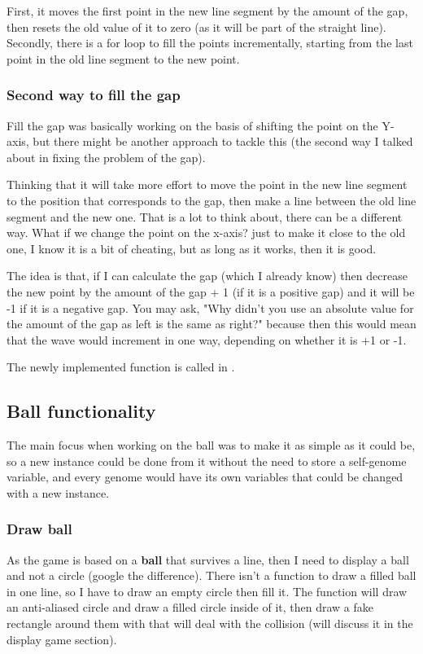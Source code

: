 First, it moves the first point in the new line segment by the amount of the gap, then resets the old value of it to zero (as it will be part of the straight line). Secondly, there is a for loop to fill the points incrementally, starting from the last point in the old line segment to the new point.

\subsubsection{Second way to fill the gap}

Fill the gap was basically working on the basis of shifting the point on the Y-axis, but there might be another approach to tackle this (the second way I talked about in fixing the problem of the gap).

Thinking that it will take more effort to move the point in the new line segment to the position that corresponds to the gap, then make a line between the old line segment and the new one. That is a lot to think about, there can be a different way. What if we change the point on the x-axis? just to make it close to the old one, I know it is a bit of cheating, but as long as it works, then it is good.

The idea is that, if I can calculate the gap (which I already know) then decrease the new point by the amount of the gap + 1 (if it is a positive gap) and it will be -1 if it is a negative gap. You may ask, "Why didn't you use an absolute value for the amount of the gap as left is the same as right?" because then this would mean that the wave would increment in one way, depending on whether it is +1 or -1.

The newly implemented function is called  in .


\subsection{Ball functionality}\label{ball-functionality}
The main focus when working on the ball was to make it as simple as it could be, so a new instance could be done from it without the need to store a self-genome variable, and every genome would have its own variables that could be changed with a new instance.

\subsubsection{Draw ball}\label{draw-ball}
As the game is based on a \textbf{ball} that survives a line, then I need to display a ball and not a circle (google the difference). There isn't a function to draw a filled ball in one line, so I have to draw an empty circle then fill it. The function  will draw an anti-aliased circle and  draw a filled circle inside of it, then draw a fake rectangle around them with  that will deal with the collision (will discuss it in the display game section).

